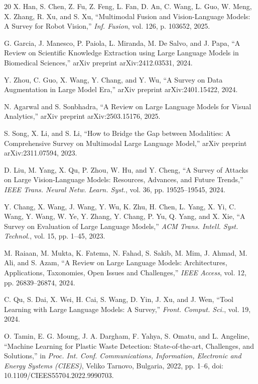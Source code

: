 \documentclass[conference]{IEEEtran}
\begin{document}
\begin{thebibliography}{20}
X. Han, S. Chen, Z. Fu, Z. Feng, L. Fan, D. An, C. Wang, L. Guo, W. Meng, X. Zhang, R. Xu, and S. Xu, ``Multimodal Fusion and Vision-Language Models: A Survey for Robot Vision,'' \textit{Inf. Fusion}, vol. 126, p. 103652, 2025.

G. Garcia, J. Manesco, P. Paiola, L. Miranda, M. De Salvo, and J. Papa, ``A Review on Scientific Knowledge Extraction using Large Language Models in Biomedical Sciences,'' arXiv preprint arXiv:2412.03531, 2024.

Y. Zhou, C. Guo, X. Wang, Y. Chang, and Y. Wu, ``A Survey on Data Augmentation in Large Model Era,'' arXiv preprint arXiv:2401.15422, 2024.

N. Agarwal and S. Sonbhadra, ``A Review on Large Language Models for Visual Analytics,'' arXiv preprint arXiv:2503.15176, 2025.

S. Song, X. Li, and S. Li, ``How to Bridge the Gap between Modalities: A Comprehensive Survey on Multimodal Large Language Model,'' arXiv preprint arXiv:2311.07594, 2023.

D. Liu, M. Yang, X. Qu, P. Zhou, W. Hu, and Y. Cheng, ``A Survey of Attacks on Large Vision-Language Models: Resources, Advances, and Future Trends,'' \textit{IEEE Trans. Neural Netw. Learn. Syst.}, vol. 36, pp. 19525--19545, 2024.

Y. Chang, X. Wang, J. Wang, Y. Wu, K. Zhu, H. Chen, L. Yang, X. Yi, C. Wang, Y. Wang, W. Ye, Y. Zhang, Y. Chang, P. Yu, Q. Yang, and X. Xie, ``A Survey on Evaluation of Large Language Models,'' \textit{ACM Trans. Intell. Syst. Technol.}, vol. 15, pp. 1--45, 2023.

M. Raiaan, M. Mukta, K. Fatema, N. Fahad, S. Sakib, M. Mim, J. Ahmad, M. Ali, and S. Azam, ``A Review on Large Language Models: Architectures, Applications, Taxonomies, Open Issues and Challenges,'' \textit{IEEE Access}, vol. 12, pp. 26839--26874, 2024.

C. Qu, S. Dai, X. Wei, H. Cai, S. Wang, D. Yin, J. Xu, and J. Wen, ``Tool Learning with Large Language Models: A Survey,'' \textit{Front. Comput. Sci.}, vol. 19, 2024.

O. Tamin, E. G. Moung, J. A. Dargham, F. Yahya, S. Omatu, and L. Angeline, ``Machine Learning for Plastic Waste Detection: State-of-the-art, Challenges, and Solutions,'' in \textit{Proc. Int. Conf. Communications, Information, Electronic and Energy Systems (CIEES)}, Veliko Tarnovo, Bulgaria, 2022, pp. 1--6, doi: 10.1109/CIEES55704.2022.9990703.


\end{thebibliography}
\end{document}
